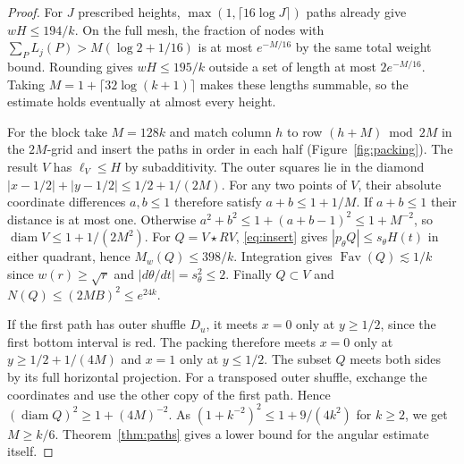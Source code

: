\documentclass[11pt,reqno]{amsart}
\newcommand{\Fav}{\operatorname{Fav}}
\newcommand{\diam}{\operatorname{diam}}
\begin{document}
\begin{proof}
For $J$ prescribed heights, $\max(1,\lceil16\log J\rceil)$ paths already give $wH\le194/k$. On the full mesh, the fraction of nodes with $\sum_P L_j(P)>M(\log2+1/16)$ is at most $e^{-M/16}$ by the same total weight bound. Rounding gives $wH\le195/k$ outside a set of length at most $2e^{-M/16}$. Taking $M=1+\lceil32\log(k+1)\rceil$ makes these lengths summable, so the estimate holds eventually at almost every height.

For the block take $M=128k$ and match column $h$ to row $(h+M)\bmod 2M$ in the $2M$-grid and insert the paths in order in each half (Figure~\ref{fig:packing}). The result $V$ has $\ell_V\le H$ by subadditivity. The outer squares lie in the diamond $|x-1/2|+|y-1/2|\le1/2+1/(2M)$. For any two points of $V$, their absolute coordinate differences $a,b\le1$ therefore satisfy $a+b\le1+1/M$. If $a+b\le1$ their distance is at most one. Otherwise $a^2+b^2\le1+(a+b-1)^2\le1+M^{-2}$, so $\diam V\le1+1/(2M^2)$. For $Q=V\star RV$, \eqref{eq:insert} gives $|p_\theta Q|\le s_\theta H(t)$ in either quadrant, hence $M_w(Q)\le398/k$. Integration gives $\Fav(Q)\lesssim1/k$ since $w(r)\ge\sqrt r$ and $|d\theta/dt|=s_\theta^2\le2$. Finally $Q\subset V$ and $N(Q)\le(2MB)^2\le e^{24k}$.

If the first path has outer shuffle $D_u$, it meets $x=0$ only at $y\ge1/2$, since the first bottom interval is red. The packing therefore meets $x=0$ only at $y\ge1/2+1/(4M)$ and $x=1$ only at $y\le1/2$. The subset $Q$ meets both sides by its full horizontal projection. For a transposed outer shuffle, exchange the coordinates and use the other copy of the first path. Hence $(\diam Q)^2\ge1+(4M)^{-2}$. As $(1+k^{-2})^2\le1+9/(4k^2)$ for $k\ge2$, we get $M\ge k/6$. Theorem~\ref{thm:paths} gives a lower bound for the angular estimate itself.
\end{proof}
\end{document}
